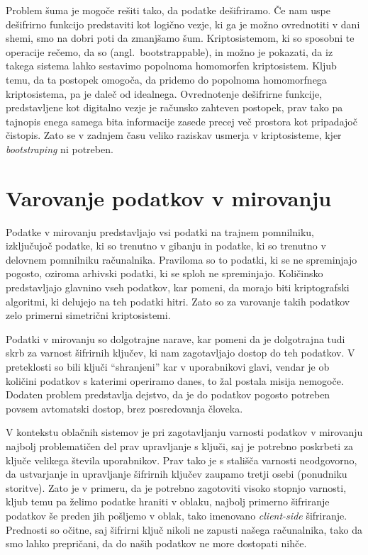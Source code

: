 \documentclass[12pt,a4paper,openany,tikz]{book}
\theoremstyle{plain}
\theoremstyle{definition}
\begin{document}
Problem šuma je mogoče rešiti tako, da podatke dešifriramo. Če nam uspe dešifrirno funkcijo predstaviti kot logično vezje, ki ga je možno ovrednotiti v dani shemi, smo na dobri poti da zmanjšamo šum. Kriptosistemom, ki so sposobni te operacije rečemo, da so  (angl.\ bootstrappable), in možno je pokazati, da iz takega sistema lahko sestavimo popolnoma homomorfen kriptosistem. Kljub temu, da ta postopek omogoča, da pridemo do popolnoma homomorfnega kriptosistema, pa je daleč od idealnega. Ovrednotenje dešifrirne funkcije, predstavljene kot digitalno vezje je računsko zahteven postopek, prav tako pa tajnopis enega samega bita informacije zasede precej več prostora kot pripadajoč čistopis. Zato se v zadnjem času veliko raziskav usmerja v kriptosisteme, kjer \textit{bootstraping} ni potreben.


\section{Varovanje podatkov v mirovanju}
\label{sec:Varovanje podatkov v mirovanju}

Podatke v mirovanju predstavljajo vsi podatki na trajnem pomnilniku, izključujoč podatke, ki so trenutno v gibanju in podatke, ki so trenutno v delovnem pomnilniku računalnika. Praviloma so to podatki, ki se ne spreminjajo pogosto, oziroma arhivski podatki, ki se sploh ne spreminjajo. Količinsko predstavljajo glavnino vseh podatkov, kar pomeni, da morajo biti kriptografski algoritmi, ki delujejo na teh podatki hitri. Zato so za varovanje takih podatkov zelo primerni simetrični kriptosistemi.

Podatki v mirovanju so dolgotrajne narave, kar pomeni da je dolgotrajna tudi skrb za varnost šifrirnih ključev, ki nam zagotavljajo dostop do teh podatkov. V preteklosti so bili ključi ``shranjeni'' kar v uporabnikovi glavi, vendar je ob količini podatkov s katerimi operiramo danes, to žal postala misija nemogoče. Dodaten problem predstavlja dejstvo, da je do podatkov pogosto potreben povsem avtomatski dostop, brez posredovanja človeka.

V kontekstu oblačnih sistemov je pri zagotavljanju varnosti podatkov v mirovanju najbolj problematičen del prav upravljanje s ključi, saj je potrebno poskrbeti za ključe velikega števila uporabnikov. Prav tako je s stališča varnosti neodgovorno, da ustvarjanje in upravljanje šifrirnih ključev zaupamo tretji osebi (ponudniku storitve). Zato je v primeru, da je potrebno zagotoviti visoko stopnjo varnosti, kljub temu pa želimo podatke hraniti v oblaku, najbolj primerno šifriranje podatkov še preden jih pošljemo v oblak, tako imenovano \textit{client-side} šifriranje. Prednosti so očitne, saj šifrirni ključ nikoli ne zapusti našega računalnika, tako da smo lahko prepričani, da do naših podatkov ne more dostopati nihče.
\end{document}
